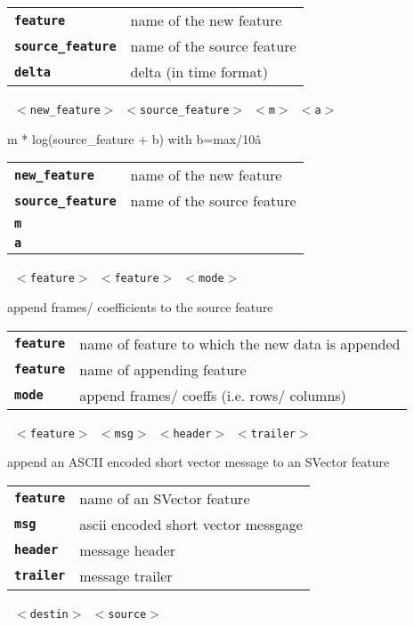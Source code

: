 \begin{description}
\begin{description}
      \begin{tabular}{ll}
 \texttt{\textbf{feature}} &         name of the new feature \\
 \texttt{\textbf{source\_feature}} &  name of the source feature \\
 \texttt{\textbf{delta}} &            delta (in time format)  \\
      \end{tabular}
       \texttt{ $<$new\_feature$>$ $<$source\_feature$>$ $<$m$>$ $<$a$>$} \

        m * log(source\_feature + b) with b=max/10\^a

      \begin{tabular}{ll}
 \texttt{\textbf{new\_feature}} &     name of the new feature \\
 \texttt{\textbf{source\_feature}} &  name of the source feature \\
 \texttt{\textbf{m}} &                 \\
 \texttt{\textbf{a}} &                 \\
      \end{tabular}
       \texttt{ $<$feature$>$ $<$feature$>$ $<$mode$>$} \

        append frames/ coefficients to the source feature

      \begin{tabular}{ll}
 \texttt{\textbf{feature}} &  name of feature to which the new data is appended \\
 \texttt{\textbf{feature}} &  name of appending feature \\
 \texttt{\textbf{mode}} &     append frames/ coeffs (i.e. rows/ columns)  \\
      \end{tabular}
       \texttt{ $<$feature$>$ $<$msg$>$ $<$header$>$ $<$trailer$>$} \

        append an ASCII encoded short vector message to an SVector feature

      \begin{tabular}{ll}
 \texttt{\textbf{feature}} &  name of an SVector feature  \\
 \texttt{\textbf{msg}} &      ascii encoded short vector messgage  \\
 \texttt{\textbf{header}} &   message header  \\
 \texttt{\textbf{trailer}} &  message trailer  \\
      \end{tabular}
       \texttt{ $<$destin$>$ $<$source$>$       } \


\end{description}
\end{description}
